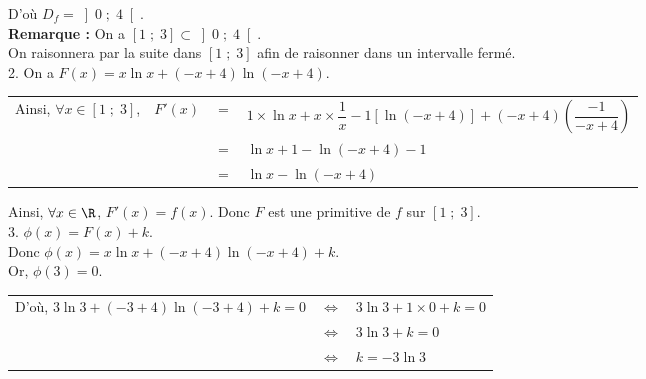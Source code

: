 D'où $D_f = \left]0 \; ; \; 4\right[$. \\

\textbf{Remarque :} On a $\left[1 \; ; \; 3\right] \subset \left] 0 \; ; \; 4\right[$. \\

On raisonnera par la suite dans $\left[1 \; ; \; 3\right]$ afin de raisonner dans un intervalle fermé. \\

2. On a $F(x) = x\ln x + \left(-x + 4\right)\ln\left(-x + 4\right)$. \\

\begin{tabular}{llll}
Ainsi, $\forall x \in \left[1 \; ; \; 3\right]$, & $F'(x)$ & $=$ & $1 \times \ln x + x \times \dfrac{1}{x}  -1\left[\ln\left(-x + 4\right)\right] + \left(-x + 4\right) \left(\dfrac{-1}{-x + 4}\right)$ \vspace*{.3cm} \\
& & $=$ & $\ln x + 1 -\ln\left(-x + 4\right) - 1$ \\
& & $=$ & $\ln x -\ln\left(-x + 4\right)$ \\
\end{tabular}

\vspace*{.3cm}

Ainsi, $\forall x \in \R$, $F'(x) = f(x)$. Donc $F$ est une primitive de $f$ sur $\left[1 \; ; \; 3\right]$. \\

3. $\phi\left(x\right) = F\left(x\right) + k$. \\

Donc $\phi\left(x\right) = x\ln x + \left(-x + 4\right)\ln\left(-x + 4\right) + k$. \\

Or, $\phi\left(3\right) = 0$. \\

\begin{tabular}{lll}
\hspace{-.3cm} D'où, $3 \ln 3 + \left(-3 + 4\right)\ln\left(-3 + 4\right) + k = 0$ & $\Longleftrightarrow$ & $3 \ln 3 + 1 \times 0 + k = 0$ \\
& $\Longleftrightarrow$ & $3 \ln 3 + k = 0$ \\
& $\Longleftrightarrow$ & $k = -3\ln 3$ \\
\end{tabular}

\vspace*{.3cm}

